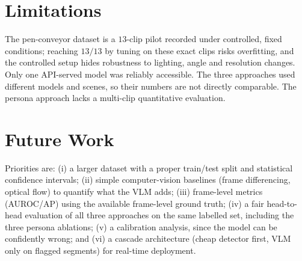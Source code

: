 \section{Limitations}
The pen-conveyor dataset is a $13$-clip pilot recorded under controlled, fixed
conditions; reaching $13/13$ by tuning on these exact clips risks overfitting, and the
controlled setup hides robustness to lighting, angle and resolution changes. Only one
API-served model was reliably accessible. The three approaches used different models and
scenes, so their numbers are not directly comparable. The persona approach lacks a
multi-clip quantitative evaluation.

\section{Future Work}
Priorities are: (i) a larger dataset with a proper train/test split and statistical
confidence intervals; (ii) simple computer-vision baselines (frame differencing, optical
flow) to quantify what the VLM adds; (iii) frame-level metrics (AUROC/AP) using the
available frame-level ground truth; (iv) a fair head-to-head evaluation of all three
approaches on the same labelled set, including the three persona ablations; (v) a
calibration analysis, since the model can be confidently wrong; and (vi) a cascade
architecture (cheap detector first, VLM only on flagged segments) for real-time
deployment.
